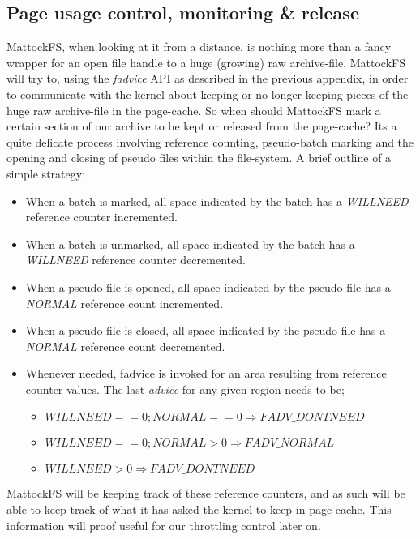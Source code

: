 \subsection{Page usage control, monitoring \& release}
MattockFS, when looking at it from a distance, is nothing more than a fancy wrapper for an open file handle to a huge (growing) raw archive-file. MattockFS will try to, using the \emph{fadvice} API as described in the previous appendix, in order to communicate with the kernel about keeping or no longer keeping pieces of the huge raw archive-file in the page-cache. So when should MattockFS mark a certain section of our archive to be kept or released from the page-cache? Its a quite delicate process involving reference counting, pseudo-batch marking and the opening and closing of pseudo files within the file-system. A brief outline of a simple strategy:
\begin{itemize}
\item When a batch is marked, all space indicated by the batch has a \emph{WILLNEED} reference counter incremented.
\item When a batch is unmarked, all space indicated by the batch has a \emph{WILLNEED} reference counter decremented.
\item When a pseudo file is opened, all space indicated by the pseudo file  has a \emph{NORMAL}  reference count incremented.
\item When a pseudo file is closed, all space indicated by the pseudo file has a \emph{NORMAL} reference count decremented.
\item Whenever needed, fadvice is invoked for an area resulting from reference counter values. The last \emph{advice} for any given region needs to be;
\begin{itemize}
\item \(WILLNEED == 0 ; NORMAL == 0 \Rightarrow FADV\_DONTNEED \)
\item \(WILLNEED == 0 ; NORMAL > 0 \Rightarrow FADV\_NORMAL \)
\item \(WILLNEED > 0 \Rightarrow FADV\_DONTNEED \)
\end{itemize} 
\end{itemize}
MattockFS will be keeping track of these reference counters, and as such will be able to keep track of what it has asked the kernel to keep in page cache. This information will proof useful for our throttling control later on.
